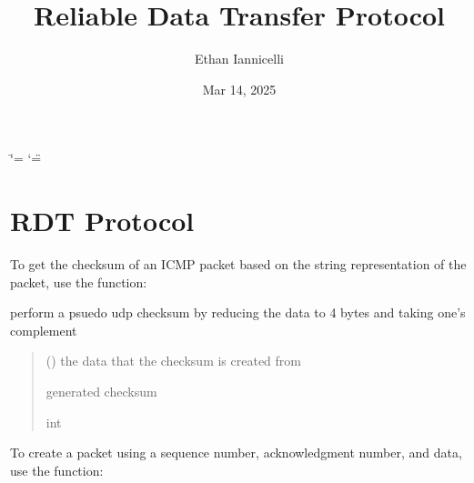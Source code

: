 \documentclass[letterpaper,10pt,english,openany,oneside]{sphinxmanual}
\title{Reliable Data Transfer Protocol}
\date{Mar 14, 2025}
\author{Ethan Iannicelli}
\begin{document}
\ifdefined\shorthandoff
  \ifnum\catcode`\=\string=\active\shorthandoff{=}\fi
  \ifnum\catcode`\"=\active{}\fi
\fi

\pagestyle{empty}
\sphinxmaketitle
\pagestyle{plain}
\sphinxtableofcontents
\pagestyle{normal}
\label{\detokenize{index::doc}}



\chapter{RDT Protocol}
\label{\detokenize{index:rdt-protocol}}
\sphinxAtStartPar
To get the checksum of an ICMP packet based on the string representation of the packet, use the  function:

\begin{fulllineitems}
\label{\detokenize{index:rdt_protocol.udp_checksum}}
\pysigstartsignatures
\pysiglinewithargsret
{}
{}
{}
\pysigstopsignatures
\sphinxAtStartPar
perform a psuedo udp checksum by reducing the data to 4 bytes and taking one’s complement
\begin{quote}\begin{description}
\sphinxAtStartPar
{} () \textendash{} the data that the checksum is created from

\sphinxAtStartPar
generated checksum

\sphinxAtStartPar
int

\end{description}\end{quote}

\end{fulllineitems}


\sphinxAtStartPar
To create a packet using a sequence number, acknowledgment number, and data, use the  function:
\end{document}
